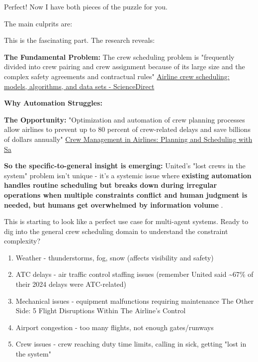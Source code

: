 \begin{botresponse}
Perfect! Now I have both pieces of the puzzle for you.

The main culprits are:

This is the fascinating part. The research reveals:

\textbf{The Fundamental Problem:} The crew scheduling problem is "frequently divided into crew pairing and crew assignment because of its large size and the complex safety agreements and contractual rules" \href{https://www.sciencedirect.com/science/article/pii/S2192437620300820}{Airline crew scheduling: models, algorithms, and data sets - ScienceDirect}

\textbf{Why Automation Struggles:}

\textbf{The Opportunity:} "Optimization and automation of crew planning processes allow airlines to prevent up to 80 percent of crew-related delays and save billions of dollars annually" \href{https://www.altexsoft.com/blog/crew-management-system-in-airlines/}{Crew Management in Airlines: Planning and Scheduling with Sa}

\textbf{So the specific-to-general insight is emerging:} United's "lost crews in the system" problem isn't unique - it's a systemic issue where \textbf{existing automation handles routine scheduling but breaks down during irregular operations when multiple constraints conflict and human judgment is needed, but humans get overwhelmed by information volume} .

This is starting to look like a perfect use case for multi-agent systems. Ready to dig into the general crew scheduling domain to understand the constraint complexity?

\begin{enumerate}
\item Weather - thunderstorms, fog, snow (affects visibility and safety)
\item ATC delays - air traffic control staffing issues (remember United said \textasciitilde{}67\% of their 2024 delays were ATC-related)
\item Mechanical issues - equipment malfunctions requiring maintenance The Other Side: 5 Flight Disruptions Within The Airline’s Control
\item Airport congestion - too many flights, not enough gates/runways
\item Crew issues - crew reaching duty time limits, calling in sick, getting "lost in the system"
\end{enumerate}


\end{botresponse}
